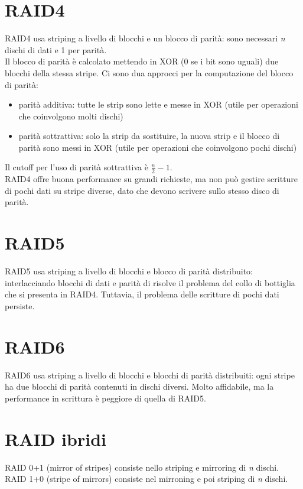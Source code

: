 \documentclass[12pt]{article}
\begin{document}
\section*{RAID4} 
RAID4 usa striping a livello di blocchi e un blocco di parità: sono necessari \textit{n} dischi di dati e 1 per parità.\\
Il blocco di parità è calcolato mettendo in XOR (0 se i bit sono uguali) due blocchi della stessa stripe.
Ci sono dua approcci per la computazione del blocco di parità:
\begin{itemize}
    \item parità additiva: tutte le strip sono lette e messe in XOR (utile per operazioni che coinvolgono molti dischi)
    \item parità sottrattiva: solo la strip da sostituire, la nuova strip e il blocco di parità sono messi in XOR (utile per operazioni che coinvolgono pochi dischi)
\end{itemize}
Il cutoff per l'uso di parità sottrattiva è $\frac{n}{2}-1$.\\
RAID4 offre buona performance su grandi richieste, ma non può gestire scritture di pochi dati su stripe diverse, dato che devono scrivere sullo stesso disco di parità.
\section*{RAID5}
RAID5 usa striping a livello di blocchi e blocco di parità distribuito: interlacciando blocchi di dati e parità di risolve il problema del collo di bottiglia che si presenta in RAID4.
Tuttavia, il problema delle scritture di pochi dati persiste.
\section*{RAID6}
RAID6 usa striping a livello di blocchi e blocchi di parità distribuiti: ogni stripe ha due blocchi di parità contenuti in dischi diversi.
Molto affidabile, ma la performance in scrittura è peggiore di quella di RAID5.
\section*{RAID ibridi}
RAID 0+1 (mirror of stripes) consiste nello striping e mirroring di \textit{n} dischi.\\
RAID 1+0 (stripe of mirrors) consiste nel mirroning e poi striping di \textit{n} dischi.\\
\end{document}
